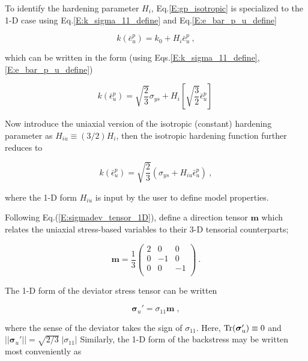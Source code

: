 \documentclass[11pt]{report}
\numberwithin{equation}{section}
\newcommand{\bmf } {\boldsymbol }
\begin{document}
To identify the hardening parameter $H_i$, Eq.\;\eqref{E:gp_isotropic} is specialized 
to the 1-D case using Eq.\;\eqref{E:k_sigma_11_define} and Eq.\;\eqref{E:e_bar_p_u_define}

\begin{equation}
k(\bar e^p_u) = k_0 + H_i  \bar e^p_u~,
\end{equation}

\noindent which can be written in the form (using Eqs.\;\eqref{E:k_sigma_11_define},
\eqref{E:e_bar_p_u_define})

\begin{equation}
k(\bar \epsilon^p_u) = \sqrt{\textstyle {\frac{2}{3}}} \sigma_{ys} + 
 H_i  \left[ \sqrt{\textstyle{\frac{3}{2}}} \bar \epsilon^p_u \right]~
\end{equation}

\noindent Now introduce the uniaxial version of the isotropic (constant) hardening parameter 
as $H_{iu}\equiv(3/2)H_i$, then the isotropic hardening function further reduces to 

\begin{equation}\label{E:H_iu_define}
k\left(\bar \epsilon^p_u\right) = 
\sqrt{ \textstyle {\frac{2}{3}} } 
\left( \sigma_{ys}+
H_{iu} \bar \epsilon^p_u\right)~,
\end{equation}

\noindent where the 1-D form $H_{iu}$ is input by the user to define model properties. 

Following Eq.\;(\ref{E:sigmadev_tensor_1D}), define a direction tensor $\bmf{m}$ which relates the uniaxial stress-based variables to their 3-D tensorial counterparts;

\begin{equation}\label{E:m_define}
\bmf{m}= \frac{1}{3}
 \begin{pmatrix}
     2 & 0 & 0 \\
      0 & -1 & 0 \\
     0 & 0 & -1\\
 \end{pmatrix}~.
\end{equation}

\noindent The 1-D form of the deviator stress tensor 
can be written

\begin{equation}\label{E:sigma_prime_1D_define}
 \bmf{\sigma}_u'=\sigma_{11}\bmf{m}\;,
 \end{equation}

\noindent  where the sense of the deviator takes the sign of
$\sigma_{11}$. Here, $\rm{Tr}(\bmf{\sigma}_u' )\equiv 0$
and $||\bmf{\sigma}_u'||=\sqrt{2/3}\; |\sigma_{11}|$
Similarly, the 1-D form of the backstress may be written most
conveniently as
\end{document}
